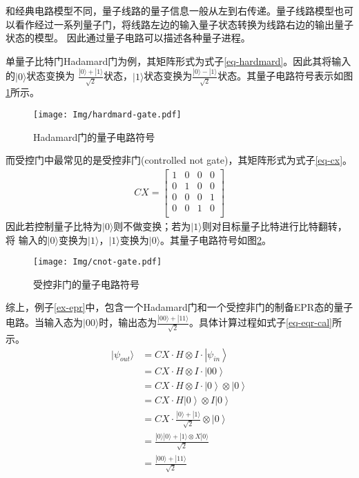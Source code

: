 和经典电路模型不同，量子线路的量子信息一般从左到右传递。量子线路模型也可以看作经过一系列量子门，将线路左边的输入量子状态转换为线路右边的输出量子状态的模型。
因此通过量子电路可以描述各种量子进程。
\begin{example}
    单量子比特门Hadamard门为例，其矩阵形式为式子\ref{eq-hardmard}。因此其将输入的\(|0\rangle\)状态变换为
\(\frac{|0\rangle+|1\rangle}{\sqrt{2}}\)状态，\(|1\rangle\)状态变换为\(\frac{|0\rangle-|1\rangle}{\sqrt{2}}\)状态。其量子电路符号表示如图\ref{fig-h}所示。
\begin{figure}[htbp]
    \centering
    \texttt{[image: Img/hardmard-gate.pdf]}
    \caption{Hadamard门的量子电路符号}
    \label{fig-h}
\end{figure}

    而受控门中最常见的是受控非门(controlled not gate)，其矩阵形式为式子\ref{eq-cx}。
    \begin{align}
        \label{eq-cx}
        CX=\left[\begin{matrix}
            1 & 0 & 0 & 0\\
            0 & 1 & 0 & 0\\
            0 & 0 & 0 & 1\\
            0 & 0 & 1 & 0\\
        \end{matrix}\right]
    \end{align}
    因此若控制量子比特为\(|0\rangle\)则不做变换；若为\(|1\rangle\)则对目标量子比特进行比特翻转，将
输入的\(|0\rangle\)变换为\(|1\rangle\)，\(|1\rangle\)变换为\(|0\rangle\)。其量子电路符号如图\ref{fig-cx}。
\begin{figure}[htbp]
    \centering
    \texttt{[image: Img/cnot-gate.pdf]}
    \caption{受控非门的量子电路符号}
    \label{fig-cx}
\end{figure}

综上，例子\ref{ex-epr}中，包含一个Hadamard门和一个受控非门的制备EPR态的量子电路。当输入态为\(|00\rangle\)时，输出态为\(\frac{|00\rangle+|11\rangle}{\sqrt{2}}\)。具体计算过程如式子\ref{eq-eqr-cal}所示。
\begin{equation}
    \label{eq-eqr-cal}
    \begin{aligned}
        |\psi_{out}\rangle &=  CX\cdot H\otimes I \cdot \left|\psi_{in}\right\rangle\\
        &= CX\cdot H\otimes I \cdot \left|00\right\rangle\\
        &= CX\cdot H\otimes I \cdot \left|0\right\rangle\otimes \left|0\right\rangle\\
        &= CX\cdot H\left|0\right\rangle\otimes I\left|0\right\rangle\\
        &= CX\cdot \frac{|0\rangle+|1\rangle}{\sqrt{2}} \otimes\left|0\right\rangle\\
        &= \frac{|0\rangle|0\rangle+|1\rangle\otimes X|0\rangle}{\sqrt{2}}\\
        &=\frac{|00\rangle+|11\rangle}{\sqrt{2}}
    \end{aligned}
\end{equation}
\end{example}
